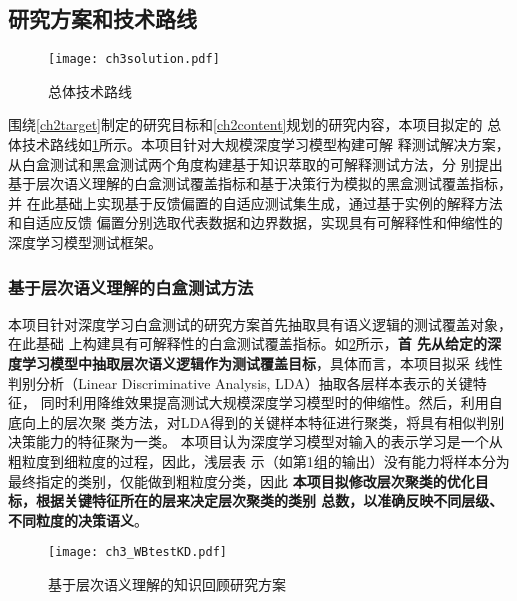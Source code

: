 \subsection{研究方案和技术路线}

\begin{figure}[h]
    \begin{small}
        \begin{center}
            \texttt{[image: ch3solution.pdf]}
        \end{center}
        \caption{总体技术路线}
        \label{fig:ch3:solution}
    \end{small}
\end{figure}

围绕\ref{ch2target}制定的研究目标和\ref{ch2content}规划的研究内容，本项目拟定的
总体技术路线如\cref{fig:ch3:solution}所示。本项目针对大规模深度学习模型构建可解
释测试解决方案，从白盒测试和黑盒测试两个角度构建基于知识萃取的可解释测试方法，分
别提出基于层次语义理解的白盒测试覆盖指标和基于决策行为模拟的黑盒测试覆盖指标，并
在此基础上实现基于反馈偏置的自适应测试集生成，通过基于实例的解释方法和自适应反馈
偏置分别选取代表数据和边界数据，实现具有可解释性和伸缩性的深度学习模型测试框架。

\subsubsection{基于层次语义理解的白盒测试方法}\label{ch3_2}

本项目针对深度学习白盒测试的研究方案首先抽取具有语义逻辑的测试覆盖对象，在此基础
上构建具有可解释性的白盒测试覆盖指标。如\cref{fig:ch3:WBtestKD}所示，\textbf{首
先从给定的深度学习模型中抽取层次语义逻辑作为测试覆盖目标}，具体而言，本项目拟采
线性判别分析（Linear Discriminative Analysis, LDA）抽取各层样本表示的关键特征，
同时利用降维效果提高测试大规模深度学习模型时的伸缩性。然后，利用自底向上的层次聚
类方法，对LDA得到的关键样本特征进行聚类，将具有相似判别决策能力的特征聚为一类。
本项目认为深度学习模型对输入的表示学习是一个从粗粒度到细粒度的过程，因此，浅层表
示（如第1组的输出）没有能力将样本分为最终指定的类别，仅能做到粗粒度分类，因此
\textbf{本项目拟修改层次聚类的优化目标，根据关键特征所在的层来决定层次聚类的类别
总数，以准确反映不同层级、不同粒度的决策语义}。

\begin{figure}[htp]
    \begin{small}
        \begin{center}
            \texttt{[image: ch3\_WBtestKD.pdf]}
        \end{center}
        \caption{基于层次语义理解的知识回顾研究方案}
        \label{fig:ch3:WBtestKD}
    \end{small}
\end{figure}

